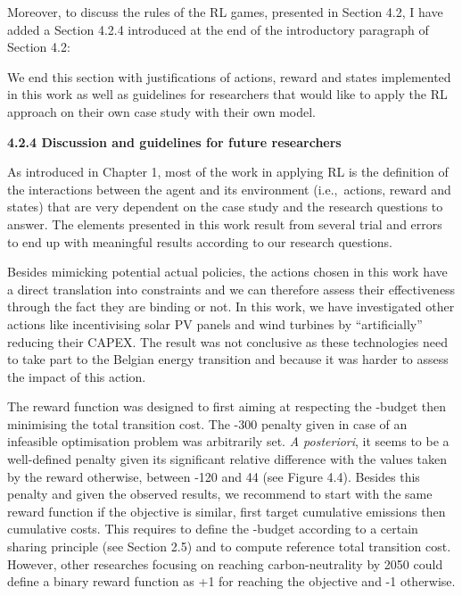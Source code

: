 \documentclass[12pt,a4paper]{article}
\def\ie{i.e.,\ }
\begin{document}
Moreover, to discuss the rules of the RL games, presented in Section 4.2, I have added {\color{blue}a Section 4.2.4} introduced {\color{blue}at the end of the introductory paragraph of Section 4.2}:

\begin{mdframed}[style=manuscript] %
We end this section with justifications of actions, reward and states implemented in this work as well as guidelines for researchers that would like to apply the RL approach on their own case study with their own model.
\end{mdframed}

\begin{mdframed}[style=manuscript] %
\textbf{4.2.4 Discussion and guidelines for future researchers}

As introduced in Chapter 1, most of the work in applying RL is the definition of the interactions between the agent and its environment (\ie actions, reward and states) that are very dependent on the case study and the research questions to answer. The elements presented in this work result from several trial and errors to end up with meaningful results according to our research questions.

Besides mimicking potential actual policies, the actions chosen in this work have a direct translation into constraints and we can therefore assess their effectiveness through the fact they are binding or not. In this work, we have investigated other actions like incentivising solar PV panels and wind turbines by ``artificially'' reducing their CAPEX. The result was not conclusive as these technologies need to take part to the Belgian energy transition and because it was harder to assess the impact of this action. 

The reward function was designed to first aiming at respecting the -budget then minimising the total transition cost. The -300 penalty given in case of an infeasible optimisation problem was arbitrarily set. \textit{A posteriori}, it seems to be a well-defined penalty given its significant relative difference with the values taken by the reward otherwise, between -120 and 44 (see Figure 4.4). Besides this penalty and given the observed results, we recommend to start with the same reward function if the objective is similar, first target cumulative emissions then cumulative costs. This requires to define the -budget according to a certain sharing principle (see Section 2.5) and to compute reference total transition cost. However, other researches focusing on reaching carbon-neutrality by 2050 could define a binary reward function as +1 for reaching the objective and -1 otherwise.


\end{mdframed}
\end{document}
